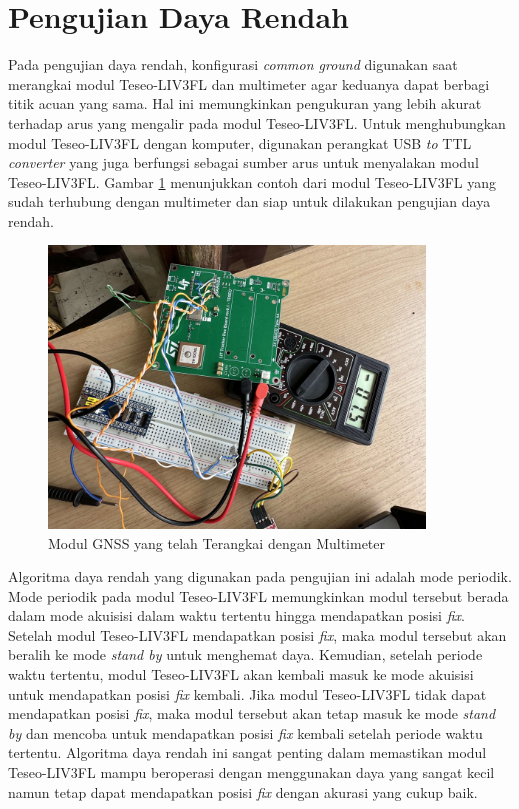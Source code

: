 \section{Pengujian Daya Rendah}
Pada pengujian daya rendah, konfigurasi \textit{common ground} digunakan saat merangkai modul Teseo-LIV3FL dan multimeter agar keduanya dapat berbagi titik acuan yang sama. Hal ini memungkinkan pengukuran yang lebih akurat terhadap arus yang mengalir pada modul Teseo-LIV3FL. Untuk menghubungkan modul Teseo-LIV3FL dengan komputer, digunakan perangkat USB \textit{to} TTL \textit{converter} yang juga berfungsi sebagai sumber arus untuk menyalakan modul Teseo-LIV3FL. Gambar \ref{Fig: low-power-connected} menunjukkan contoh dari modul Teseo-LIV3FL yang sudah terhubung dengan multimeter dan siap untuk dilakukan pengujian daya rendah.

\begin{figure}[H]
	\centering
	\includegraphics[width=10cm]{contents/chapter-4/low-power.jpg}
	\caption{Modul GNSS yang telah Terangkai dengan Multimeter}
	\label{Fig: low-power-connected}
\end{figure}

Algoritma daya rendah yang digunakan pada pengujian ini adalah mode periodik. Mode periodik pada modul Teseo-LIV3FL memungkinkan modul tersebut berada dalam mode akuisisi dalam waktu tertentu hingga mendapatkan posisi \textit{fix}. Setelah modul Teseo-LIV3FL mendapatkan posisi \textit{fix}, maka modul tersebut akan beralih ke mode \textit{stand by} untuk menghemat daya. Kemudian, setelah periode waktu tertentu, modul Teseo-LIV3FL akan kembali masuk ke mode akuisisi untuk mendapatkan posisi \textit{fix} kembali. Jika modul Teseo-LIV3FL tidak dapat mendapatkan posisi \textit{fix}, maka modul tersebut akan tetap masuk ke mode \textit{stand by} dan mencoba untuk mendapatkan posisi \textit{fix} kembali setelah periode waktu tertentu. Algoritma daya rendah ini sangat penting dalam memastikan modul Teseo-LIV3FL mampu beroperasi dengan menggunakan daya yang sangat kecil namun tetap dapat mendapatkan posisi \textit{fix} dengan akurasi yang cukup baik.

